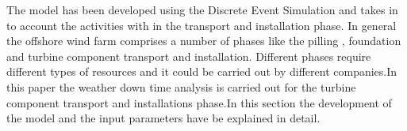 The model has been developed using the Discrete Event Simulation and takes in to account the activities with in the transport and installation phase. In general the offshore wind farm comprises a number of phases like the pilling , foundation and turbine component transport and installation. Different phases require different types of resources and it could be carried out by different companies.In this paper the weather down time analysis is carried out for the turbine component transport and installations phase.In this section the development of the model and the input  parameters have be explained in detail.

